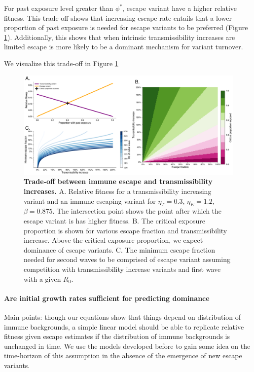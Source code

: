 \documentclass[12pt,oneside,letterpaper]{article}
\begin{document}
For past exposure level greater than $\phi^{*}$, escape variant have a higher relative fitness.
This trade off shows that increasing escape rate entails that a lower proportion of past exposure is needed for escape variants to be preferred (Figure \ref{fig:transmission_tradeoff}).
Additionally, this shows that when intrinsic transmissibility increases are limited escape is more likely to be a dominant mechanism for variant turnover.

We visualize this trade-off in Figure \ref{fig:transmission_tradeoff}

\begin{figure}[h]
    \centering
    \includegraphics[width=0.8\linewidth]{./figures/transmission_tradeoff.png}
    \caption{\textbf{Trade-off between immune escape and transmissibility increases.}
    A. Relative fitness for a transmissibility increasing variant and an immune escaping variant for $\eta_{T}=0.3$, $\eta_{E}=1.2$, $\beta=0.875$.
    The intersection point shows the point after which the escape variant is has higher fitness.
    B. The critical exposure proportion is shown for various escape fraction and transmissibility increase. Above the critical exposure proportion, we expect dominance of escape variants.
    C. The minimum escape fraction needed for second waves to be comprised of escape variant assuming competition with transmissibility increase variants and first wave with a given $R_{0}$.}
    \label{fig:transmission_tradeoff}
\end{figure}

\paragraph{Are initial growth rates sufficient for predicting dominance}%

Main points: though our equations show that things depend on distribution of immune backgrounds, a simple linear model should be able to replicate relative fitness given escape estimates if the distribution of immune backgrounds is unchanged in time.
We use the models developed before to gain some idea on the time-horizon of this assumption in the absence of the emergence of new escape variants.
\end{document}
